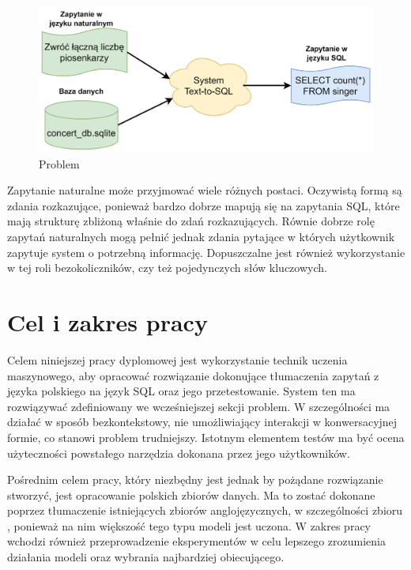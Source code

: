 \begin{figure}[ht!]
  \centering
  \includegraphics[width=1.0\linewidth]{images/text_to_sql.png}
  \caption{Problem }
  \label{fig:text-to-sql}
\end{figure}

Zapytanie naturalne może przyjmować wiele różnych postaci. Oczywistą formą są zdania rozkazujące, ponieważ bardzo dobrze mapują się na zapytania SQL, które mają strukturę zbliżoną właśnie do zdań rozkazujących. Równie dobrze rolę zapytań naturalnych mogą pełnić jednak zdania pytające w których użytkownik zapytuje system o potrzebną informację. Dopuszczalne jest również wykorzystanie w tej roli bezokoliczników, czy też pojedynczych słów kluczowych.

\section{Cel i zakres pracy}
Celem niniejszej pracy dyplomowej jest wykorzystanie technik uczenia maszynowego, aby opracować rozwiązanie dokonujące tłumaczenia zapytań z języka polskiego na język SQL oraz jego przetestowanie. System ten ma rozwiązywać zdefiniowany we wcześniejszej sekcji problem. W szczególności ma działać w sposób bezkontekstowy, nie umożliwiający interakcji w konwersacyjnej formie, co stanowi problem trudniejszy. Istotnym elementem testów ma być ocena użyteczności powstałego narzędzia dokonana przez jego użytkowników.

Pośrednim celem pracy, który niezbędny jest jednak by pożądane rozwiązanie stworzyć, jest opracowanie polskich zbiorów danych. Ma to zostać dokonane poprzez tłumaczenie istniejących zbiorów anglojęzycznych, w szczególności zbioru , ponieważ na nim większość tego typu modeli jest uczona. W zakres pracy wchodzi również przeprowadzenie eksperymentów w celu lepszego zrozumienia działania modeli  oraz wybrania najbardziej obiecującego.

